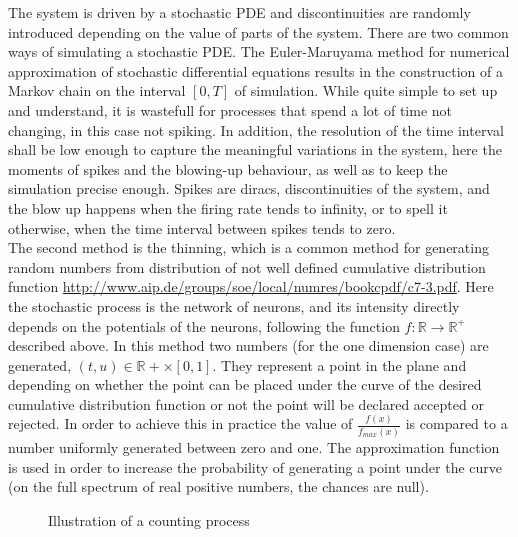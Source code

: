 	The system is driven by a stochastic PDE and discontinuities are randomly introduced depending on the value of parts of the system. There are two common ways of simulating a stochastic PDE. The Euler-Maruyama method for numerical approximation of stochastic differential equations results in the construction of a Markov chain on the interval $[0,T]$ of simulation. While quite simple to set up and understand, it is wastefull for processes that spend a lot of time not changing, in this case not spiking. In addition, the resolution of the time interval shall be low enough to capture the meaningful variations in the system, here the moments of spikes and the blowing-up behaviour, as well as to keep the simulation precise enough. Spikes are diracs, discontinuities of the system, and the blow up happens when the firing rate tends to infinity, or to spell it otherwise, when the time interval between spikes tends to zero.\\
	The second method is the thinning, which is a common method for generating random numbers from distribution of not well defined cumulative distribution function \url{http://www.aip.de/groups/soe/local/numres/bookcpdf/c7-3.pdf}. Here the stochastic process is the network of neurons, and its intensity directly depends on the potentials of the neurons, following the function $f:\mathbb{R}\rightarrow\mathbb{R}^+$ described above. In this method two numbers (for the one dimension case) are generated, $(t,u)\in\mathbb{R}+\times[0,1]$. They represent a point in the plane and depending on whether the point can be placed under the curve of the desired cumulative distribution function or not the point will be declared accepted or rejected. In order to achieve this in practice the value of $\frac{f(x)}{f_{max}(x)}$ is compared to a number uniformly generated between zero and one. The approximation function is used in order to increase the probability of generating a point under the curve (on the full spectrum of real positive numbers, the chances are null).\\

	\begin{figure}
		\begin{center}
			\end{center}
			\caption{Illustration of a counting process}
			\label{fig:count-proc}
	\end{figure}

